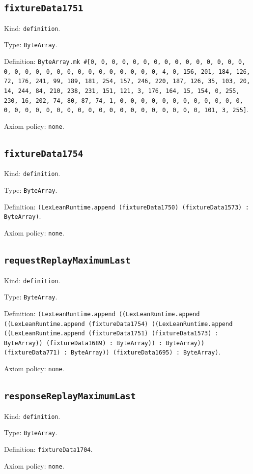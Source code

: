 \documentclass[11pt]{article}
\begin{document}
\subsection*{\texttt{fixtureData1751}}
\noindent Kind: \texttt{definition}.\par
\noindent Type: \texttt{ByteArray}.\par
\noindent Definition: \texttt{ByteArray.mk \#[0, 0, 0, 0, 0, 0, 0, 0, 0, 0, 0, 0, 0, 0, 0, 0, 0, 0, 0, 0, 0, 0, 0, 0, 0, 0, 0, 0, 0, 0, 4, 0, 156, 201, 184, 126, 72, 176, 241, 99, 189, 181, 254, 157, 246, 220, 187, 126, 35, 103, 20, 14, 244, 84, 210, 238, 231, 151, 121, 3, 176, 164, 15, 154, 0, 255, 230, 16, 202, 74, 80, 87, 74, 1, 0, 0, 0, 0, 0, 0, 0, 0, 0, 0, 0, 0, 0, 0, 0, 0, 0, 0, 0, 0, 0, 0, 0, 0, 0, 0, 0, 0, 0, 0, 0, 101, 3, 255]}.\par
\noindent Axiom policy: \texttt{none}.\par
\subsection*{\texttt{fixtureData1754}}
\noindent Kind: \texttt{definition}.\par
\noindent Type: \texttt{ByteArray}.\par
\noindent Definition: \texttt{(LexLeanRuntime.append (fixtureData1750) (fixtureData1573) : ByteArray)}.\par
\noindent Axiom policy: \texttt{none}.\par
\subsection*{\texttt{requestReplayMaximumLast}}
\noindent Kind: \texttt{definition}.\par
\noindent Type: \texttt{ByteArray}.\par
\noindent Definition: \texttt{(LexLeanRuntime.append ((LexLeanRuntime.append ((LexLeanRuntime.append (fixtureData1754) ((LexLeanRuntime.append ((LexLeanRuntime.append (fixtureData1751) (fixtureData1573) : ByteArray)) (fixtureData1689) : ByteArray)) : ByteArray)) (fixtureData771) : ByteArray)) (fixtureData1695) : ByteArray)}.\par
\noindent Axiom policy: \texttt{none}.\par
\subsection*{\texttt{responseReplayMaximumLast}}
\noindent Kind: \texttt{definition}.\par
\noindent Type: \texttt{ByteArray}.\par
\noindent Definition: \texttt{fixtureData1704}.\par
\noindent Axiom policy: \texttt{none}.\par
\end{document}
